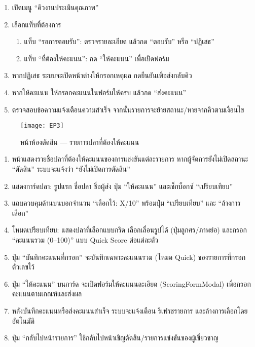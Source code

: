 \par

\begin{sloppypar}
	\begin{enumerate}
		\item เปิดเมนู “คิวงานประเมินคุณภาพ”
		\item เลือกแท็บที่ต้องการ
		\begin{enumerate}
			\item แท็บ “รอการตอบรับ”: ตรวจรายละเอียด แล้วกด “ตอบรับ” หรือ “ปฏิเสธ”
			\item แท็บ “ที่ต้องให้คะแนน”: กด “ให้คะแนน” เพื่อเปิดฟอร์ม
		\end{enumerate}
		\item หากปฏิเสธ ระบบจะเปิดหน้าต่างให้กรอกเหตุผล กดยืนยันเพื่อส่งกลับคิว
		\item หากให้คะแนน ให้กรอกคะแนนในฟอร์มให้ครบ แล้วกด “ส่งคะแนน”
		\item ตรวจสอบข้อความแจ้งเตือนความสำเร็จ จากนั้นรายการจะย้ายสถานะ/หายจากคิวตามเงื่อนไข
	\end{enumerate}
\end{sloppypar}


\begin{figure}[h]
	\centering
	\texttt{[image: EP3]}
	\caption{หน้าห้องตัดสิน — รายการปลาที่ต้องให้คะแนน}
\end{figure}

\par

\begin{sloppypar}
	\begin{enumerate}
		\item หน้าแสดงรายชื่อปลาที่ต้องให้คะแนนของการแข่งขันแต่ละรายการ หากผู้จัดการยังไม่เปิดสถานะ “ตัดสิน” ระบบจะแจ้งว่า “ยังไม่เปิดการตัดสิน”
		\item แสดงการ์ดปลา: รูปแรก ชื่อปลา ชื่อผู้ส่ง ปุ่ม “ให้คะแนน” และเช็กบ็อกซ์ “เปรียบเทียบ”
		\item แถบควบคุมด้านบนบอกจำนวน “เลือกไว้: X/10” พร้อมปุ่ม “เปรียบเทียบ” และ “ล้างการเลือก”
		\item โหมดเปรียบเทียบ: แสดงปลาที่เลือกแบบกริด เลือกเลื่อนรูปได้ (ปุ่มลูกศร/ภาพย่อ) และกรอก “คะแนนรวม (0–100)” แบบ Quick Score ต่อแต่ละตัว
		\item ปุ่ม “บันทึกคะแนนที่กรอก” จะบันทึกเฉพาะคะแนนรวม (โหมด Quick) ของรายการที่กรอกตัวเลขไว้
		\item ปุ่ม “ให้คะแนน” บนการ์ด จะเปิดฟอร์มให้คะแนนละเอียด (ScoringFormModal) เพื่อกรอกคะแนนตามเกณฑ์และส่งผล
		\item หลังบันทึกคะแนนหรือส่งคะแนนสำเร็จ ระบบจะแจ้งเตือน รีเฟรชรายการ และล้างการเลือกโดยอัตโนมัติ
		\item ปุ่ม “กลับไปหน้ารายการ” ใช้กลับไปหน้าเชิญตัดสิน/รายการแข่งขันของผู้เชี่ยวชาญ
	\end{enumerate}
\end{sloppypar}


